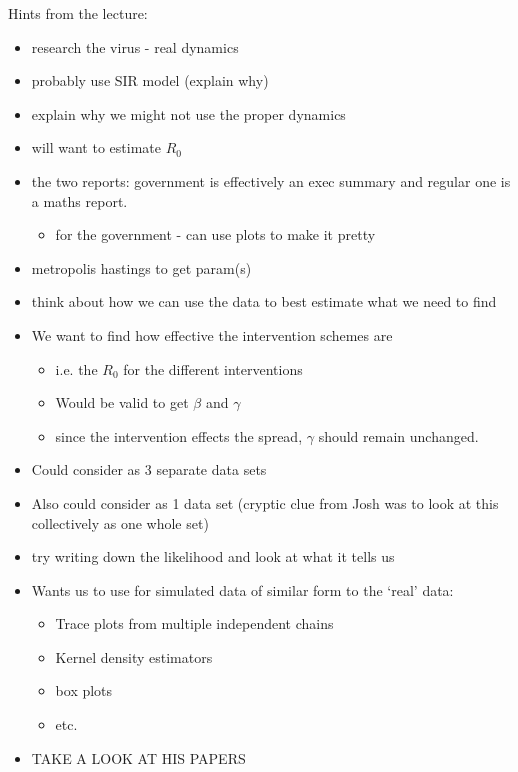 \documentclass{X:/Documents/Coding/Latex/myassignment}
\begin{document}
Hints from the lecture: 
\begin{itemize}
	\item research the virus - real dynamics
	\item probably use SIR model (explain why)
	\item explain why we might not use the proper dynamics
	\item will want to estimate $R_0$
	\item the two reports: government is effectively an exec summary and regular one is a maths report.
	\begin{itemize}
		\item for the government - can use plots to make it pretty
	\end{itemize}
	\item metropolis hastings to get param(s)
	\item think about how we can use the data to best estimate what we need to find
	\item We want to find how effective the intervention schemes are
	\begin{itemize}
		\item i.e. the $R_0$ for the different interventions
		\item Would be valid to get $\beta$ and $\gamma$ 
		\item since the intervention effects the spread, $\gamma$ should remain unchanged.
	\end{itemize}
	\item Could consider as 3 separate data sets
	\item Also could consider as 1 data set (cryptic clue from Josh was to look at this collectively as one whole set)
	\item try writing down the likelihood and look at what it tells us
	\item Wants us to use for simulated data of similar form to the `real' data:
	\begin{itemize}
		\item Trace plots from multiple independent chains
		\item Kernel density estimators
		\item box plots
		\item etc.
	\end{itemize}
	\item TAKE A LOOK AT HIS PAPERS
\end{itemize}



%
\end{document}
